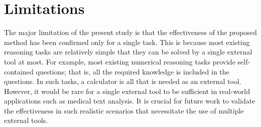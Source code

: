 \section*{Limitations}
The major limitation of the present study is that the effectiveness of the proposed method has been confirmed only for a single task.
This is because most existing reasoning tasks are relatively simple that they can be solved by a single external tool at most.
For example, most existing numerical reasoning tasks provide self-contained questions; that is, all the required knowledge is included in the questions.
In such tasks, a calculator is all that is needed as an external tool.
However, it would be rare for a single external tool to be sufficient in real-world applications such as medical text analysis.
It is crucial for future work to validate the effectiveness in such realistic scenarios that necessitate the use of multiple external tools.

\clearpage

